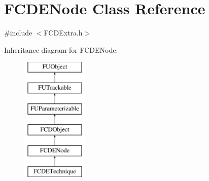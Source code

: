 \hypertarget{classFCDENode}{
\section{FCDENode Class Reference}
\label{classFCDENode}
}


{\ttfamily \#include $<$FCDExtra.h$>$}

Inheritance diagram for FCDENode:\begin{figure}[H]
\begin{center}
\leavevmode
\includegraphics[height=6.000000cm]{classFCDENode}
\end{center}
\end{figure}
